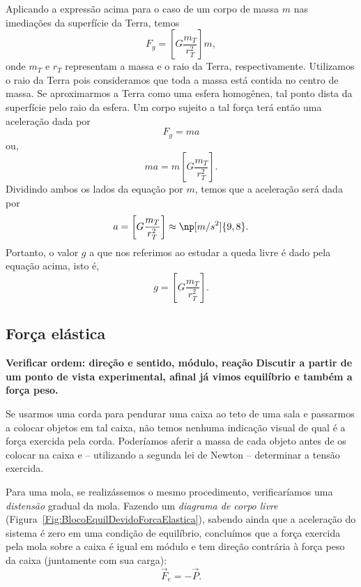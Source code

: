 Aplicando a expressão acima para o caso de um corpo de massa $m$ nas imediações da superfície da Terra, temos
\begin{equation}
  F_g = \left[G \frac{m_T}{r_T^2}\right]m,
\end{equation}
%
onde $m_T$ e $r_T$ representam a massa e o raio da Terra, respectivamente. Utilizamos o raio da Terra pois consideramos que toda a massa está contida no centro de massa. Se aproximarmos a Terra como uma esfera homogênea, tal ponto dista da superfície pelo raio da esfera. Um corpo sujeito a tal força terá então uma aceleração dada por
\begin{equation}
  F_g = ma
\end{equation}
%
ou,
\begin{equation}\label{Eq:EliminaM}
  ma = m \left[G \frac{m_T}{r_T^2}\right].
\end{equation}
%
Dividindo ambos os lados da equação por $m$, temos que a aceleração será dada por
\begin{equation}
  a = \left[G \frac{m_T}{r_T^2}\right] \approx \np[m/s^2]{9,8}.
\end{equation}
%
Portanto, o valor $g$ a que nos referimos ao estudar a queda livre é dado pela equação acima, isto é,
\begin{equation}
  g = \left[G \frac{m_T}{r_T^2}\right].
\end{equation}

\subsection{Força elástica}

\textbf{Verificar ordem: direção e sentido, módulo, reação}
\textbf{Discutir a partir de um ponto de vista experimental, afinal já vimos equilíbrio e também a força peso.}

Se usarmos uma corda para pendurar uma caixa ao teto de uma sala e passarmos a colocar objetos em tal caixa, não temos nenhuma indicação visual de qual é a força exercida pela corda. Poderíamos aferir a massa de cada objeto antes de os colocar na caixa e -- utilizando a segunda lei de Newton -- determinar a tensão exercida.

Para uma mola, se realizássemos o mesmo procedimento, verificaríamos uma \emph{distensão} gradual da mola. Fazendo um \emph{diagrama de corpo livre} (Figura~\ref{Fig:BlocoEquilDevidoForcaElastica}), sabendo ainda que a aceleração do sistema é zero em uma condição de equilíbrio, concluímos que a força exercida pela mola sobre a caixa é igual em módulo e tem direção contrária à força peso da caixa (juntamente com sua carga):
\begin{equation}
	\vec{F}_e = -\vec{P}.
\end{equation}

